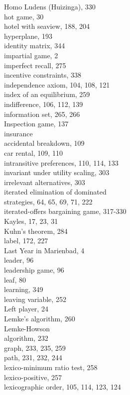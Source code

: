 \documentclass[12pt]{article}
\begin{document}
Homo Ludens (Huizinga), 330\\
hot game, 30\\
hotel with seaview, 188, 204\\
hyperplane, 193\\
identity matrix, 344\\
impartial game, 2\\
imperfect recall, 275\\
incentive constraints, 338\\
independence axiom, 104, 108, 121\\
index of an equilibrium, 259\\
indifference, 106, 112, 139\\
information set, 265, 266\\
Inspection game, 137\\
insurance\\
accidental breakdown, 109\\
car rental, 109, 110\\
intransitive preferences, 110, 114, 133\\
invariant under utility scaling, 303\\
irrelevant alternatives, 303\\
iterated elimination of dominated\\
strategies, 64, 65, 69, 71, 222\\
iterated-offers bargaining game, 317-330\\
Kayles, 17, 23, 31\\
Kuhn's theorem, 284\\
label, 172, 227\\
Last Year in Marienbad, 4\\
leader, 96\\
leadership game, 96\\
leaf, 80\\
learning, 349\\
leaving variable, 252\\
Left player, 24\\
Lemke's algorithm, 260\\
Lemke-Howson\\
algorithm, 232\\
graph, 233, 235, 259\\
path, 231, 232, 244\\
lexico-minimum ratio test, 258\\
lexico-positive, 257\\
lexicographic order, 105, 114, 123, 124\\
\end{document}
